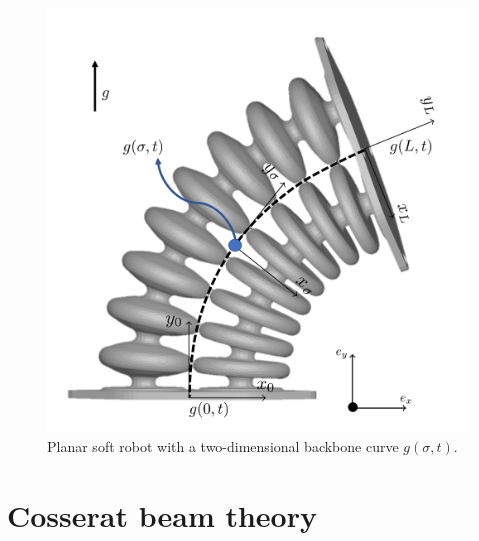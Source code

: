 \begin{figure}[H]
\begin{minipage}{.5\textwidth}
    \includegraphics[width=\textwidth]{Figures/Chapter2/actuatorschematic.png}
    \vspace{15pt}
    \caption{Planar soft robot with a two-dimensional backbone curve $g(\sigma,t)$.}
    \label{fig2:kinematicschematic}
\end{minipage}
\end{figure}





\section{Cosserat beam theory}

